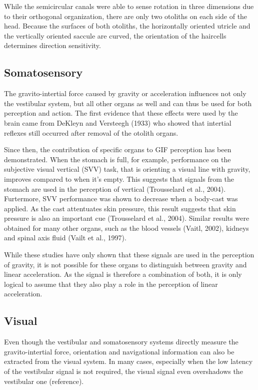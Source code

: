 While the semicircular canals were able to sense rotation in three dimensions due to their orthogonal organization, there are only two otoliths on each side of the head. Because the surfaces of both otoliths, the horizontally oriented utricle and the vertically oriented saccule are curved, the orientation of the haircells determines direction sensitivity. 



\subsection{Somatosensory}
The gravito-intertial force caused by gravity or acceleration influences not only the vestibular system, but all other organs as well and can thus be used for both perception and action. The first evidence that these effects were used by the brain came from DeKleyn and Versteegh (1933) who showed that intertial reflexes still occurred after removal of the otolith organs.

Since then, the contribution of specific organs to GIF perception has been demonstrated. When the stomach is full, for example, performance on the subjective visual vertical (SVV) task, that is orienting a visual line with gravity, improves compared to when it's empty. This suggests that signals from the stomach are used in the perception of vertical (Trousselard et al., 2004). Furtermore, SVV performance was shown to decrease when a body-cast was applied. As the cast attentuates skin pressure, this result suggests that skin pressure is also an important cue (Trousselard et al., 2004). Similar results were obtained for many other organs, such as the blood vessels (Vaitl, 2002), kidneys and spinal axis fluid (Vailt et al., 1997).

While these studies have only shown that these signals are used in the perception of gravity, it is not possible for these organs to distinguish between gravity and linear acceleration. As the signal is therefore a combination of both, it is only logical to assume that they also play a role in the perception of linear acceleration.

\subsection{Visual}
Even though the vestibular and somatosensory systems directly measure the gravito-intertial force, orientation and navigational information can also be extracted from the visual system. In many cases, especially when the low latency of the vestibular signal is not required, the visual signal even overshadows the vestibular one (reference).

